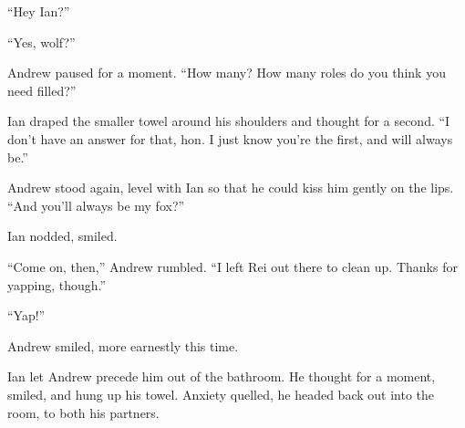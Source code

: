 ``Hey Ian?''

``Yes, wolf?''

Andrew paused for a moment. ``How many? How many roles do you think you need filled?''

Ian draped the smaller towel around his shoulders and thought for a second. ``I don't have an answer for that, hon. I just know you're the first, and will always be.''

Andrew stood again, level with Ian so that he could kiss him gently on the lips. ``And you'll always be my fox?''

Ian nodded, smiled.

``Come on, then,'' Andrew rumbled. ``I left Rei out there to clean up. Thanks for yapping, though.''

``Yap!''

Andrew smiled, more earnestly this time.

Ian let Andrew precede him out of the bathroom. He thought for a moment, smiled, and hung up his towel. Anxiety quelled, he headed back out into the room, to both his partners.
